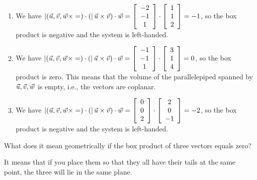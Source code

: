 \documentclass{ximera}
\begin{document}
\begin{example}
\begin{solution}
\begin{enumerate}
      \item We have
        $\boxprod{\vect{u},\vect{v},\vect{w}} = (\vect{u}\times\vect{v})
        \cdot \vect{w} = \startmat{c}-2\\-1\\1\stopmat\cdot\startmat{c}1\\1\\2\stopmat=-1$, so
        the box product is negative and the system is left-handed.
      \item We have
        $\boxprod{\vect{u},\vect{v},\vect{w}} = (\vect{u}\times\vect{v})
        \cdot \vect{w} = \startmat{c}-1\\-1\\1\stopmat\cdot\startmat{c}3\\1\\4\stopmat=0$, so
        the box product is zero. This means that the volume of the
        parallelepiped spanned by $\vect{u},\vect{v},\vect{w}$ is empty,
        i.e., the vectors are coplanar.
      \item We have
        $\boxprod{\vect{u},\vect{v},\vect{w}} = (\vect{u}\times\vect{v})
        \cdot \vect{w} = \startmat{c}0\\0\\2\stopmat\cdot\startmat{c}2\\0\\-1\stopmat=-2$, so
        the box product is negative and the system is left-handed.
      \end{enumerate}
    \end{solution}
  \end{example}
  
  
  \begin{example} \label{exer-box-product-zero}
    What does it mean geometrically if the box product of three vectors
    equals zero?
    \begin{solution}
      It means that if you place them so that they all have their tails
      at the same point, the three will lie in the same plane.
    \end{solution}
  \end{example}
  
\end{document}
